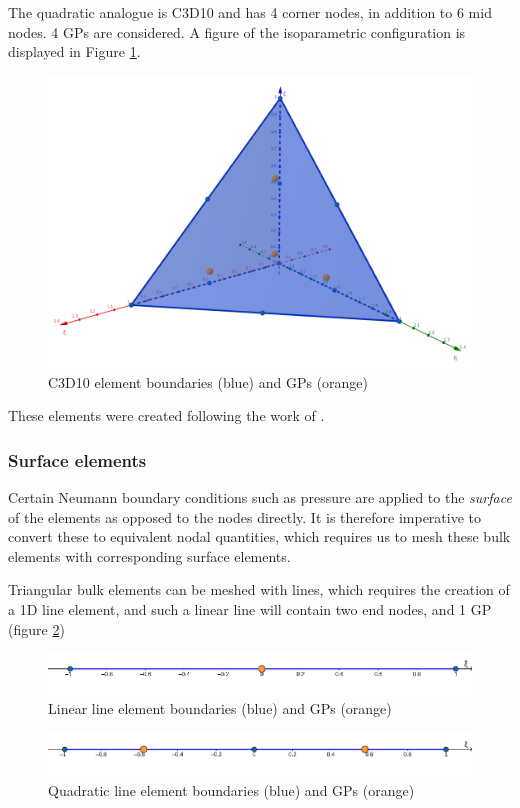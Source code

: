 \documentclass[oneside,11pt,times]{book}
\begin{document}
The quadratic analogue is C3D10 and has 4 corner nodes, in addition to 6 mid nodes. 4 GPs are considered. A figure of the isoparametric configuration is displayed in Figure \ref{figureQuadTet}.

\begin{figure}[!htb]
\centering
 \includegraphics[scale=0.3]{imgs/SpatialDiscretisation/TetQuad.png}
 \caption{C3D10 element boundaries (blue) and GPs (orange)}
 \label{figureQuadTet}
\end{figure}
These elements were created following the work of \citep{dunavant:1985}.

\subsubsection{Surface elements}
Certain Neumann boundary conditions such as pressure are applied to the \textit{surface} of the elements as opposed to the nodes directly. It is therefore imperative to convert these to equivalent nodal quantities, which requires us to mesh these bulk elements with corresponding surface elements.

Triangular bulk elements can be meshed with lines, which requires the creation of a 1D line element, and such a linear line will contain two end nodes, and 1 GP (figure \ref{figureLinLin})

\begin{figure}[!htb]
\centering
 \includegraphics[scale=0.4]{imgs/SpatialDiscretisation/LinLin.png}
 \caption{Linear line element boundaries (blue) and GPs (orange)}
 \label{figureLinLin}
\end{figure}
\begin{figure}[!htb]
\centering
 \includegraphics[scale=0.4]{imgs/SpatialDiscretisation/QuadLin.png}
 \caption{Quadratic line element boundaries (blue) and GPs (orange)}
 \label{figureQuadLin}
\end{figure}
\end{document}
